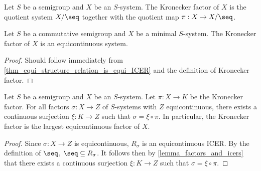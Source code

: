 \begin{definition}
\label{def_kronecker_factor}
    Let $S$ be a semigroup and $X$ be an $S$-system.  The Kronecker factor of $X$ is the quotient system $X/\seq$ together with the quotient map $\pi: X \to X/\seq$.
\end{definition}

\begin{theorem}
    \label{thm_kronecker_is_equicontinuous_system}
    Let $S$ be a commutative semigroup and $X$ be a minimal $S$-system. The Kronecker factor of $X$ is an equicontinuous system.
\end{theorem}

\begin{proof}
    Should follow immediately from \cref{thm_equi_structure_relation_is_equi_ICER} and the definition of Kronecker factor.
\end{proof}


\begin{theorem}
\label{thm_kronecker_factor_description}
    Let $S$ be a semigroup and $X$ be an $S$-system.  Let $\pi: X \to K$ be the Kronecker factor.  For all factors $\sigma: X \to Z$ of $S$-systems with $Z$ equicontinuous, there exists a continuous surjection $\xi: K \to Z$ such that $\sigma = \xi \circ \pi$.  In particular, the Kronecker factor is the largest equicontinuous factor of $X$.
\end{theorem}

\begin{proof}
    Since $\sigma: X \to Z$ is equicontinuous, $R_\sigma$ is an equicontinuous ICER.  By the definition of $\seq$, $\seq \subseteq R_\sigma$.  It follows then by \cref{lemma_factors_and_icers} that there exists a continuous surjection $\xi: K \to Z$ such that $\sigma = \xi \circ \pi$.
\end{proof}


